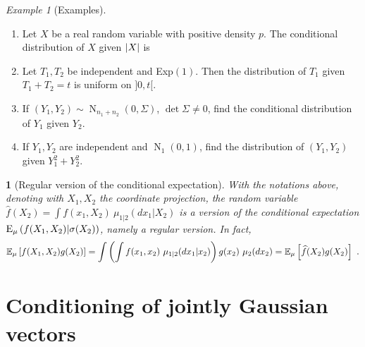 \documentclass[12pt,a4paper]{amsart}
\newcommand{\gaussian}[3]{\operatorname{N}_{#1}\left(#2,#3\right)}
\theoremstyle{plain}%
\newtheorem{npar}{}%
\theoremstyle{definition}
\theoremstyle{remark}
\newtheorem{example}{Example}
\begin{document}
\begin{example}[Examples]\ 
  \begin{enumerate}
\item Let $X$ be a real random variable with positive density $p$. The conditional distribution of $X$ given $\left\vert X\right\vert$ is 
  \item Let $T_1,T_2$ be independent and Exp$(1)$. Then the distribution of $T_1$ given $T_1+T_2=t$ is uniform on $]0,t[$.
  \item If $(Y_1,Y_2) \sim \gaussian {n_1+n_2} 0 \Sigma$, $\det \Sigma \ne 0$, find the conditional distribution of $Y_1$ given $Y_2$.
  \item If $Y_1,Y_2$ are independent and $\gaussian {1} 0 1$, find the distribution of $(Y_1,Y_2)$ given $Y_1^2 + Y_2^2$. 
  \end{enumerate}
\end{example}

\begin{npar}[Regular version of the conditional expectation] With the notations above, denoting with $X_1,X_2$ the coordinate projection, the random variable $\widehat f(X_2) = \int f(x_1,X_2) \ \mu_{1|2}(dx_1|X_2)$ is a version of the conditional expectation $\operatorname{E}_{\mu}\left(f(X_1,X_2) \middle| \sigma(X_2)\right)$, namely a \emph{regular version}. In fact,
  \begin{equation*}
    \operatorname{\mathbb E}_{\mu}\left[f(X_1,X_2)g(X_2)\right] = \int \left(\int f(x_1,x_2) \ \mu_{1|2}(dx_1|x_2)\right)g(x_2) \ \mu_2(dx_2) = \operatorname{\mathbb E}_{\mu}\left[\widehat f(X_2)g(X_2)\right] \ .
  \end{equation*}
\end{npar}

\section{Conditioning of jointly Gaussian vectors}
\label{sec:cond-jointly-gauss}
\end{document}
